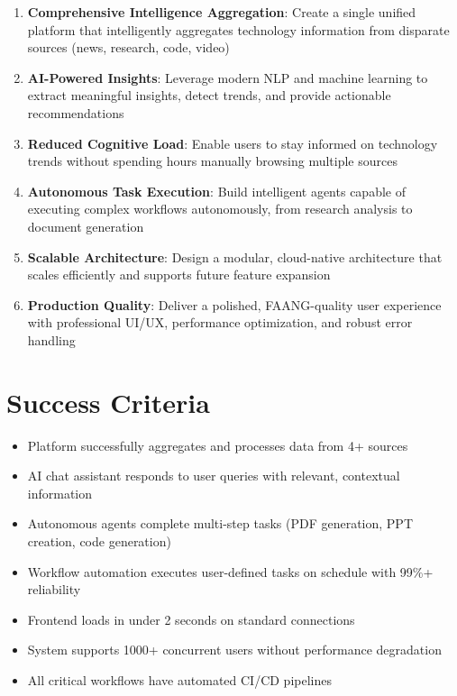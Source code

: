 \documentclass[12pt,oneside]{report}
\begin{document}
\begin{enumerate}
    \item \textbf{Comprehensive Intelligence Aggregation}: Create a single unified platform that intelligently aggregates technology information from disparate sources (news, research, code, video)
    
    \item \textbf{AI-Powered Insights}: Leverage modern NLP and machine learning to extract meaningful insights, detect trends, and provide actionable recommendations
    
    \item \textbf{Reduced Cognitive Load}: Enable users to stay informed on technology trends without spending hours manually browsing multiple sources
    
    \item \textbf{Autonomous Task Execution}: Build intelligent agents capable of executing complex workflows autonomously, from research analysis to document generation
    
    \item \textbf{Scalable Architecture}: Design a modular, cloud-native architecture that scales efficiently and supports future feature expansion
    
    \item \textbf{Production Quality}: Deliver a polished, FAANG-quality user experience with professional UI/UX, performance optimization, and robust error handling
\end{enumerate}

\section{Success Criteria}

\begin{itemize}
    \item Platform successfully aggregates and processes data from 4+ sources
    \item AI chat assistant responds to user queries with relevant, contextual information
    \item Autonomous agents complete multi-step tasks (PDF generation, PPT creation, code generation)
    \item Workflow automation executes user-defined tasks on schedule with 99\%+ reliability
    \item Frontend loads in under 2 seconds on standard connections
    \item System supports 1000+ concurrent users without performance degradation
    \item All critical workflows have automated CI/CD pipelines
\end{itemize}
\end{document}
